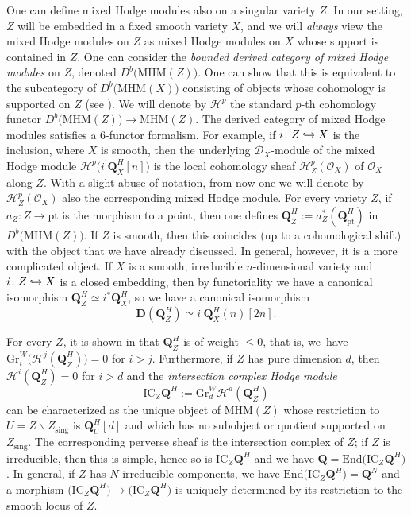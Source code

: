\documentclass[JEP,XML,SOM,Unicode]{cedram}
\newcommand\hto{\mathrel{\lhook\joinrel\to}}
\newcommand{\DXmodule}{$\cD_X$\nobreakdash-mod\-ule\xspace}
\theoremstyle{plain}
\theoremstyle{definition}
\newcommand\Q{{\mathbf Q}}
\newcommand\cD{\mathcal{D}}
\newcommand\cH{\mathcal{H}}
\newcommand\cO{\mathcal{O}}
\newcommand\cH{\mathcal{H}}
\newcommand\cO{\mathcal{O}}
\newcommand\gr{\mathrm{Gr}}
\newcommand\sing{\mathrm{sing}}
\begin{document}
One can define mixed Hodge modules also on a singular variety $Z$. In our setting, $Z$ will be embedded in a fixed smooth variety $X$,
and we will \emph{always} view the mixed Hodge modules on $Z$ as mixed Hodge modules on $X$
whose support is contained in $Z$. One can consider the \emph{bounded derived category of mixed Hodge modules} on $Z$, denoted $D^b\big(\mathrm{MHM}(Z)\big)$.
One can show that this is equivalent to the subcategory of $D^b\big(\mathrm{MHM}(X)\big)$ consisting of objects whose cohomology is supported on $Z$ (see \cite[Cor.\,2.23]{Saito_MHM}).
We will denote by $\cH^p$ the standard $p$-th cohomology functor $D^b\big(\mathrm{MHM}(Z)\big)\to \mathrm{MHM}(Z)$.
The derived category of mixed Hodge modules satisfies a 6-functor formalism. For example, if $i\colon Z\hto X$ is the inclusion, where $X$ is smooth, then the underlying \DXmodule of the mixed Hodge module $\cH^p\big(i^!\Q_X^H[n]\big)$
is the \hbox{local} cohomology sheaf $\cH^p_Z(\cO_X)$ of $\cO_X$ along $Z$. With a slight abuse of notation, from now one we will denote by $\cH^p_Z(\cO_X)$
also the corresponding mixed Hodge module.
For every variety $Z$, if $a_Z\colon Z\to \mathrm{pt}$ is the morphism to a point, then one defines $\Q_Z^H:=a_Z^*(\Q_\mathrm{pt}^H)$ in $D^b\big(\mathrm{MHM}(Z)\big)$. If $Z$ is smooth, then this coincides
(up to a cohomological shift) with the object that we have already discussed. In general, however, it is a more complicated object.
If $X$ is a smooth, irreducible $n$-dimensional variety and $i\colon Z\hto X$ is a closed embedding, then
by functoriality we have
a canonical isomorphism $\Q_Z^H\simeq i^*\Q_X^H$, so we have a canonical isomorphism
\begin{equation}\label{eq1_dual_Q}
{\mathbf D}(\Q_Z^H)\simeq i^!\Q_X^H(n)[2n].
\end{equation}

For every $Z$, it is shown in
\cite[\S 4.5]{Saito_MHM} that $\Q_Z^H$ is of weight $\leq 0$, that is, we~have $\gr^W_i\big(\cH^j(\Q_Z^H)\big)\!=\!0$ for $i\!>\!j$. Furthermore, if $Z$ has pure dimension $d$,
then $\cH^i(\Q_Z^H)\!=\!0$ for $i>d$ and the \emph{intersection complex Hodge module}
\begin{equation}\label{definition_IC}
\mathrm{IC}_Z\Q^H:=\gr^W_d\cH^d(\Q_Z^H)
\end{equation}
can be characterized as the unique object of $\mathrm{MHM}(Z)$ whose restriction to $U=Z\smallsetminus Z_\sing$ is $\Q_U^H[d]$ and which has no subobject or quotient supported on
$Z_\sing$. The corresponding perverse sheaf is the intersection complex of $Z$; if $Z$ is irreducible, then
this is simple, hence so is $\mathrm{IC}_Z\Q^H$ and we have $\Q=\mathrm{End}\big(\mathrm{IC}_Z\Q^H\big)$. In general, if $Z$ has $N$ irreducible
components, we have $\mathrm{End}\big(\mathrm{IC}_Z\Q^H\big)=\Q^N$ and a morphism $\big(\mathrm{IC}_Z\Q^H\big)\to \big(\mathrm{IC}_Z\Q^H\big)$
is uniquely determined by its restriction to the smooth locus of $Z$.
\end{document}
